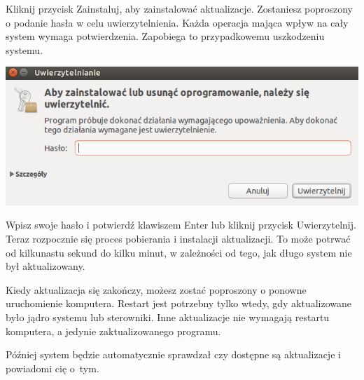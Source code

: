 Kliknij przycisk \textcolor{ubuntu_orange}{Zainstaluj}, aby zainstalować aktualizacje. Zostaniesz poproszony o podanie hasła w celu uwierzytelnienia. Każda operacja mająca wpływ na cały system wymaga potwierdzenia. Zapobiega to przypadkowemu uszkodzeniu systemu.

\begin{center}
	\includegraphics{images/unity_uwierzytelnienie.png}
\end{center}

Wpisz swoje hasło i potwierdź klawiszem Enter lub kliknij przycisk \textcolor{ubuntu_orange}{Uwierzytelnij}. Teraz rozpocznie się proces pobierania i instalacji aktualizacji. To może potrwać od kilkunastu sekund do kilku minut, w zależności od tego, jak długo system nie był aktualizowany.

Kiedy aktualizacja się zakończy, możesz zostać poproszony o ponowne uruchomienie komputera. Restart jest potrzebny tylko wtedy, gdy aktualizowane było jądro systemu lub sterowniki. Inne aktualizacje nie wymagają restartu komputera, a jedynie zaktualizowanego programu.

Później system będzie automatycznie sprawdzał czy dostępne są aktualizacje i powiadomi cię o~tym.
\clearpage
